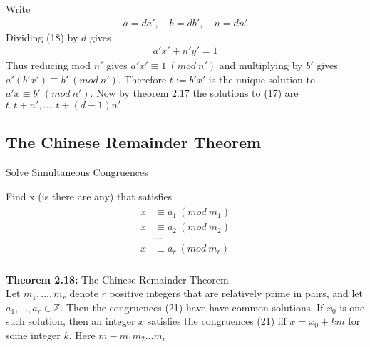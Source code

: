 \documentclass[a4paper]{article}
\begin{document}
Write
\begin{align}
    a=da',\quad b=db',\quad n=dn'
\end{align}
Dividing (18) by $d$ gives
\begin{align}
    a'x'+n'y'=1
\end{align}
Thus reducing mod $n'$ gives $a'x'\equiv1\ (mod\ n')$ and multiplying by $b'$
gives $a'(b'x')\equiv b'\ (mod\ n')$. Therefore $t:=b'x'$ is the unique solution
to $a'x\equiv b'\ (mod\ n')$. Now by theorem 2.17 the solutions to (17) are
$t,t+n',...,t+(d-1)n'$


\subsection{The Chinese Remainder Theorem}
Solve Simultaneous Congruences

Find x (is there are any) that satisfies
\begin{align}
    \begin{split}
        x & \equiv a_1\ (mod\ m_1)\\
        x & \equiv a_2\ (mod\ m_2)\\
          & ...\\
        x & \equiv a_r\ (mod\ m_r)\\
    \end{split}
\end{align}

\textbf{Theorem 2.18:} The Chinese Remainder Theorem\\
Let $m_1,...,m_r$ denote $r$ positive integers that are relatively prime in pairs,
and let $a_1,...,a_r\in\mathbb{Z}$. Then the congruences (21) have have common
solutions. If $x_0$ is one such solution, then an integer $x$ satisfies the
congruences (21) iff $x=x_0+km$ for some integer $k$. Here $m-m_1m_2...m_r$

\end{document}
